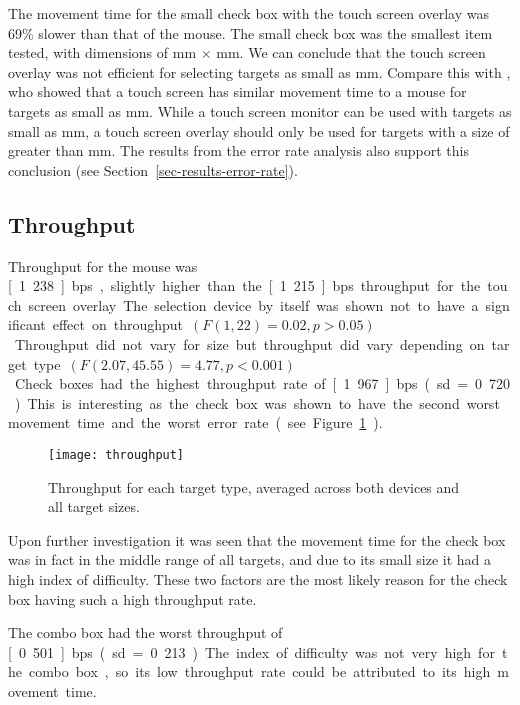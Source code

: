 \documentclass{elsart}
\begin{document}
The movement time for the small check box with the touch screen overlay
was 69\% slower than that of the mouse. The small check box was the
smallest item tested, with dimensions of \unit[4]{mm} \(\times\)
\unit[4]{mm}. We can conclude that the touch screen overlay was not
efficient for selecting targets as small as \unit[4]{mm}. Compare this
with \citet{Sear-A-1991-IJMMS}, who showed that a touch screen has
similar movement time to a mouse for targets as small as \unit[2]{mm}.
While a touch screen monitor can be used with targets as small as
\unit[2]{mm}, a touch screen overlay should only be used for targets
with a size of greater than \unit[4]{mm}. The results from the error
rate analysis also support this conclusion (see
Section~\ref{sec-results-error-rate}).


\subsection{Throughput}
\label{sec-results-throughput}

Throughput for the mouse was \unit[1.238]{bps}, slightly higher than the
\unit[1.215]{bps} throughput for the touch screen overlay. The selection
device by itself was shown not to have a significant effect on
throughput \((F(1, 22) = 0.02, p > 0.05)\). Throughput did not vary for
size but throughput did vary depending on target type \((F(2.07, 45.55)
= 4.77, p < 0.001)\). Check boxes had the highest throughput rate of
\unit[1.967]{bps} (sd = 0.720). This is interesting as the check box was
shown to have the second worst movement time and the worst error rate
(see Figure~\ref{fig-throughput}).


\begin{figure}
	\centering
	\texttt{[image: throughput]}
	\caption{Throughput for each target type, averaged across both
	devices and all target sizes.}
	\label{fig-throughput}
\end{figure}


Upon further investigation it was seen that the movement time for the
check box was in fact in the middle range of all targets, and due to its
small size it had a high index of difficulty. These two factors are the
most likely reason for the check box having such a high throughput rate.

The combo box had the worst throughput of \unit[0.501]{bps} (sd =
0.213). The index of difficulty was not very high for the combo box, so
its low throughput rate could be attributed to its high movement time.
\end{document}
